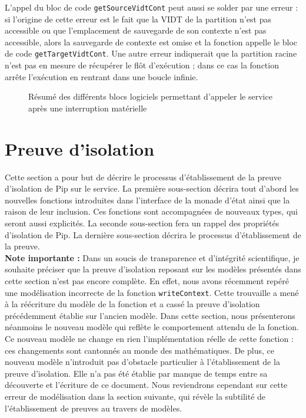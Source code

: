 		L'appel du bloc de code \texttt{getSourceVidtCont} peut aussi se solder par une erreur : si l'origine de cette erreur est le fait que la VIDT de la partition n'est pas accessible ou que l'emplacement de sauvegarde de son contexte n'est pas accessible, alors la sauvegarde de contexte est omise et la fonction appelle le bloc de code \texttt{getTargetVidtCont}. Une autre erreur indiquerait que la partition racine n'est pas en mesure de récupérer le flôt d'exécution ; dans ce cas la fonction arrête l'exécution en rentrant dans une boucle infinie.

		\begin{figure}[!ht]
			\centering
			
			\caption{Résumé des différents blocs logiciels permettant d'appeler le service après une interruption matérielle}
			\label{fig:interrupt_software}
		\end{figure}

	\section{Preuve d'isolation}

		Cette section a pour but de décrire le processus d'établissement de la preuve d'isolation de Pip sur le service. La première sous-section décrira tout d'abord les nouvelles fonctions introduites dans l'interface de la monade d'état ainsi que la raison de leur inclusion. Ces fonctions sont accompagnées de nouveaux types, qui seront aussi explicités. La seconde sous-section fera un rappel des propriétés d'isolation de Pip. La dernière sous-section décrira le processus d'établissement de la preuve.\\

		\textbf{Note importante :} Dans un soucis de transparence et d'intégrité scientifique, je souhaite préciser que la preuve d'isolation reposant sur les modèles présentés dans cette section n'est pas encore complète. En effet, nous avons récemment repéré une modélisation incorrecte de la fonction \texttt{writeContext}. Cette trouvaille a mené à la réécriture du modèle de la fonction et a cassé la preuve d'isolation précédemment établie sur l'ancien modèle. Dans cette section, nous présenterons néanmoins le nouveau modèle qui reflète le comportement attendu de la fonction. Ce nouveau modèle ne change en rien l'implémentation réelle de cette fonction : ces changements sont cantonnés au monde des mathématiques. De plus, ce nouveau modèle n'introduit pas d'obstacle particulier à l'établissement de la preuve d'isolation. Elle n'a pas été établie par manque de temps entre sa découverte et l'écriture de ce document. Nous reviendrons cependant sur cette erreur de modélisation dans la section suivante, qui révèle la subtilité de l'établissement de preuves au travers de modèles.

